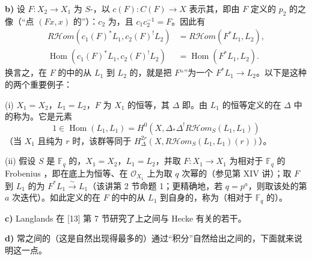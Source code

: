 \textbf{b)} 设 $F:X_2\to X_1$ 为 $S$-，以 $c(F):C(F)\to X$ 表示其，即由 $F$ 定义的 $p_2$ 的之像（“点 $(Fx,x)$ 的”）：$c_2$ 为，且 $c_1c_2^{-1}=F$。因此有
\[
\begin{aligned}
R\mathcal Hom(c_1(F)^*L_1,c_2(F)^!L_2)&=R\mathcal Hom(F^*L_1,L_2),\\
\operatorname{Hom}(c_1(F)^*L_1,c_2(F)^!L_2)&=\operatorname{Hom}(F^*L_1,L_2).
\end{aligned}\tag{3.2.6}
\]
换言之，在 $F$ 的中的从 $L_1$ 到 $L_2$ 的，就是把 $F$“”为一个 $F^*L_1\to L_2$。以下是这种的两个重要例子：

(i) $X_1=X_2$，$L_1=L_2$，$F$ 为 $X_1$ 的恒等，其 $\Delta$ 即。由 $L_1$ 的恒等定义的在 $\Delta$ 中的称为。它是元素
\[
1\in\operatorname{Hom}(L_1,L_1)=H^0(X,\Delta_*\Delta^!R\mathcal Hom_S(L_1,L_1))
\]
（当 $X_1$ 且纯为 $r$ 时，该群等同于
$H_\Delta^{2r}(X,R\mathcal Hom_S(L_1,L_1)(r))$）。

(ii) 假设 $S$ 是 $\mathbb F_q$ 的，$X_1=X_2$，$L_1=L_2$，并取 $F:X_1\to X_1$ 为相对于 $\mathbb F_q$ 的 Frobenius ，即在底上为恒等、在 $\mathcal O_{X_1}$ 上为取 $q$ 次幂的（参见第 XIV 讲）；取 $F$ 到 $L_1$ 的为 $F^*L_1\xrightarrow\sim L_1$（该讲第 2 节命题 1；更精确地，若 $q=p^a$，则取该处的第 $a$ 次迭代）。如此定义的在 $F$ 的中的从 $L_1$ 到自身的，称为（相对于 $\mathbb F_q$ 的）。

\textbf{c)} Langlands 在 [13] 第 7 节研究了上之间与 Hecke 有关的若干。

\textbf{d)} 常之间的（这是自然出现得最多的）通过“积分”自然给出之间的，下面就来说明这一点。

